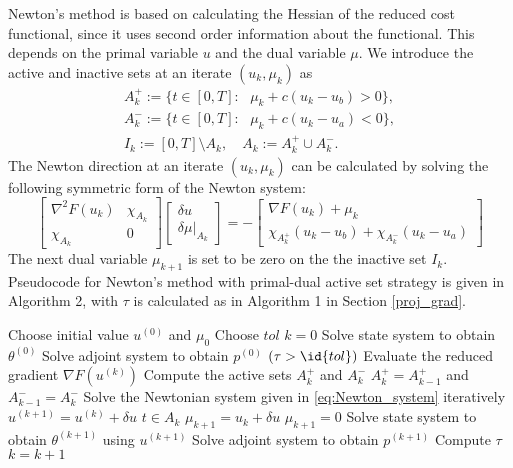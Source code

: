 Newton's method is based on calculating the Hessian of the reduced cost functional, since it uses second order information about the functional. This depends on the primal variable $u$ and the dual variable $\mu$. We introduce the active and inactive sets at an iterate $(u_k, \mu_k)$ as
\begin{align}
    \label{eq:active_inactive}
    A_k^{+} := \{ t \in [0,T]: \text{ } \mu_k + c(u_k - u_b) >0 \}, \\
    A_k^{-} := \{ t \in [0,T]: \text{ } \mu_k + c(u_k - u_a) <0 \}, \\
    I_k := [0,T] \setminus A_k, \quad A_k := A_k^{+} \cup A_k^{-}.
\end{align}
The Newton direction at an iterate $(u_k, \mu_k)$ can be calculated by solving the following symmetric form of the Newton system:
\begin{equation}
    \label{eq:Newton_system}
    \begin{bmatrix}
        \nabla^2 F(u_k) & \chi_{A_k} \\
        \chi_{A_k} & 0 
    \end{bmatrix}
    \begin{bmatrix}
    \delta u \\
    \delta \mu|_{A_k}
    \end{bmatrix}
    = - \begin{bmatrix}
    \nabla F(u_k) + \mu_k \\
    \chi_{A_k^{+}}(u_k - u_b) + \chi_{A_k^{-}}(u_k - u_a)
    \end{bmatrix}
\end{equation}
The next dual variable $\mu_{k+1}$ is set to be zero on the the inactive set $I_k$. Pseudocode for Newton's method with primal-dual active set strategy is given in Algorithm 2, with $\tau$ is calculated as in Algorithm 1 in Section \ref{proj_grad}.
\begin{codebox}
\li Choose initial value $u^{(0)}$ and $\mu_0$ 
\li Choose $tol$
\li $k = 0$
\li Solve state system to obtain $\theta^{(0)}$
\li Solve adjoint system to obtain $p^{(0)}$
\li \While $(\tau > \id{tol})$ \Then 
\li Evaluate the reduced gradient $\nabla F(u^{(k)})$
\li Compute the active sets $A_k^{+}$ and $A_k^{-}$
\li \If $A_k^{+} = A_{k-1}^{+}$ and $A_{k-1}^{-} = A_k^{-}$ \Then 
\li \Return \End
\li Solve the Newtonian system given in \eqref{eq:Newton_system} iteratively
\li $u^{(k+1)} = u^{(k)} + \delta u$  
\li \If $t \in A_k$ \Then
    \li $\mu_{k+1} = u_k + \delta u$
    \li \Else $\mu_{k+1} = 0$ 
    \End
\li Solve state system to obtain $\theta^{(k+1)}$ using $u^{(k+1)}$
\li Solve adjoint system to obtain $p^{(k+1)}$ 
\li Compute $\tau$
\li $k = k+1$
\end{codebox}

